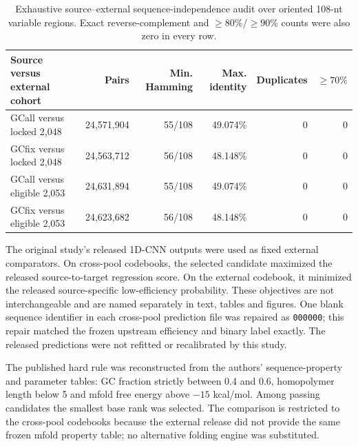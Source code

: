 \documentclass[10pt]{article}
\begin{document}
\begin{table}[H]
\centering
\small
\begin{tabular}{lrrrrr}
\toprule
Source versus external cohort & Pairs & Min. Hamming & Max. identity & Duplicates & $\geq70\%$ \\
\midrule
GCall versus locked 2,048 & 24,571,904 & 55/108 & 49.074\% & 0 & 0 \\
GCfix versus locked 2,048 & 24,563,712 & 56/108 & 48.148\% & 0 & 0 \\
GCall versus eligible 2,053 & 24,631,894 & 55/108 & 49.074\% & 0 & 0 \\
GCfix versus eligible 2,053 & 24,623,682 & 56/108 & 48.148\% & 0 & 0 \\
\bottomrule
\end{tabular}
\caption{Exhaustive source--external sequence-independence audit over oriented 108-nt variable regions. Exact reverse-complement and $\geq80\%$/$\geq90\%$ counts were also zero in every row.}
\label{tab:s-external-distance}
\end{table}

The original study's released 1D-CNN outputs were used as fixed external comparators. On cross-pool codebooks, the selected candidate maximized the released source-to-target regression score. On the external codebook, it minimized the released source-specific low-efficiency probability. These objectives are not interchangeable and are named separately in text, tables and figures. One blank sequence identifier in each cross-pool prediction file was repaired as \texttt{000000}; this repair matched the frozen upstream efficiency and binary label exactly. The released predictions were not refitted or recalibrated by this study.

The published hard rule was reconstructed from the authors' sequence-property and parameter tables: GC fraction strictly between 0.4 and 0.6, homopolymer length below 5 and mfold free energy above $-15$ kcal/mol. Among passing candidates the smallest base rank was selected. The comparison is restricted to the cross-pool codebooks because the external release did not provide the same frozen mfold property table; no alternative folding engine was substituted.
\end{document}

